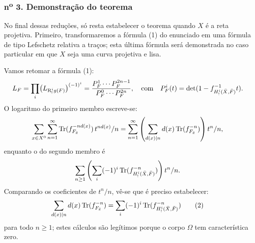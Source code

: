 \subsubsection*{n\textsuperscript{o} 3. Demonstração do teorema}

No final dessas reduções, só resta estabelecer o teorema quando $X$ é a reta projetiva. Primeiro, transformaremos a fórmula (1) do enunciado em uma fórmula de tipo Lefschetz relativa a traços; esta última fórmula será demonstrada no caso particular em que $X$ seja uma curva projetiva e lisa.

Vamos retomar a fórmula (1):
\[
L_F=\prod_i\bigl(L_{\mathrm{R}^i_!g(F)}\bigr)^{(-1)^i}
=\frac{P_F^1\cdots P_F^{2n-1}}{P_F^0\cdots P_F^{2n}},
\quad\text{com}\quad
P_F^i(t)=\det(1-f^{-1}_{H^i_!(\bar X,\bar F)}t).
\]
O logaritmo do primeiro membro escreve-se:
\[
\sum_{x\in X^0}\sum_{n=1}^{\infty}\operatorname{Tr}(f_{F_{\bar x}}^{-n d(x)})\,t^{n d(x)}/n
=\sum_{n=1}^{\infty}\left(\sum_{d(x)|n} d(x)\operatorname{Tr}(f_{F_{\bar x}}^{-n})\right)t^n/n,
\]
enquanto o do segundo membro é
\[
\sum_{n\ge1}\left(\sum_i(-1)^i\operatorname{Tr}(f^{-n}_{H^i_!(\bar X,\bar F)})\right)t^n/n.
\]
Comparando os coeficientes de $t^n/n$, vê-se que é preciso estabelecer:
\[
\sum_{d(x)|n}d(x)\operatorname{Tr}(f_{F_{\bar x}}^{-n})
=\sum_i(-1)^i\operatorname{Tr}(f^{-n}_{H^i_!(\bar X,\bar F)})
\tag{2}
\]
para todo $n\ge1$; estes cálculos são legítimos porque o corpo $\Omega$ tem característica zero.
